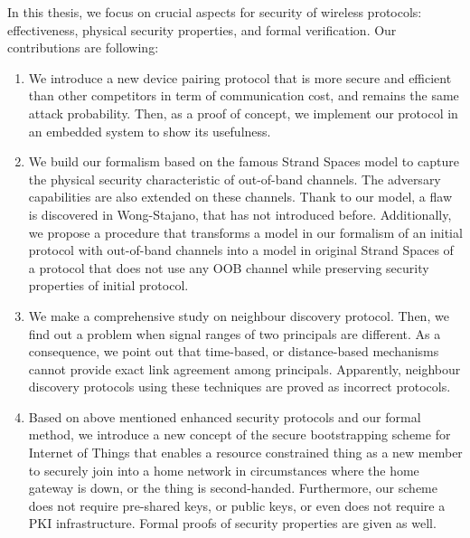 In this thesis, we focus on crucial aspects for security of wireless protocols: effectiveness, physical security properties, and formal verification. Our contributions are following: 

\begin{enumerate}

\item We introduce a new device pairing protocol that is more secure and efficient than other competitors in term of communication cost, and remains the same attack probability. Then, as a proof of concept, we implement our protocol in an embedded system to show its usefulness.
\item We build our formalism based on the famous Strand Spaces model to capture the physical security characteristic of out-of-band channels. The adversary capabilities are also extended on these channels. Thank to our model, a flaw is discovered in Wong-Stajano, that has not introduced before. Additionally, we propose a procedure that transforms a model in our formalism of an initial protocol with out-of-band channels into a model in original Strand Spaces of a protocol that does not use any OOB channel while preserving security properties of initial protocol. 
\item We make a comprehensive study on neighbour discovery protocol. Then, we find out a problem when signal ranges of two principals are different. As a consequence, we point out that time-based, or distance-based mechanisms cannot provide exact link agreement among principals. Apparently, neighbour discovery protocols using these techniques are proved as incorrect protocols. 
\item Based on above mentioned enhanced security protocols and our formal method, we introduce a new concept of the secure bootstrapping scheme for Internet of Things that enables a resource constrained thing as a new member to securely join into a home network in circumstances where the home gateway is down, or the thing is second-handed. Furthermore, our scheme does not require pre-shared keys, or public keys, or even does not require a PKI infrastructure. Formal proofs of security properties are given as well. 
\end{enumerate}

